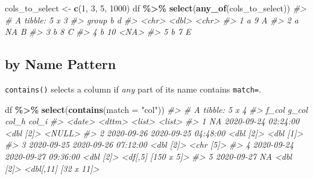 \documentclass[
]{report}
\newenvironment{Shaded}{\begin{snugshade}}{\end{snugshade}}
\newcommand{\CommentTok}[1]{\textcolor[rgb]{0.56,0.35,0.01}{\textit{#1}}}
\newcommand{\DataTypeTok}[1]{\textcolor[rgb]{0.13,0.29,0.53}{#1}}
\newcommand{\DecValTok}[1]{\textcolor[rgb]{0.00,0.00,0.81}{#1}}
\newcommand{\KeywordTok}[1]{\textcolor[rgb]{0.13,0.29,0.53}{\textbf{#1}}}
\newcommand{\NormalTok}[1]{#1}
\newcommand{\OperatorTok}[1]{\textcolor[rgb]{0.81,0.36,0.00}{\textbf{#1}}}
\newcommand{\StringTok}[1]{\textcolor[rgb]{0.31,0.60,0.02}{#1}}
\begin{document}
\begin{Shaded}
\begin{Highlighting}[]
\NormalTok{cols\_to\_select \textless{}{-}}\StringTok{ }\KeywordTok{c}\NormalTok{(}\DecValTok{1}\NormalTok{, }\DecValTok{3}\NormalTok{, }\DecValTok{5}\NormalTok{, }\DecValTok{1000}\NormalTok{)}
\NormalTok{df }\OperatorTok{\%\textgreater{}\%}
\StringTok{  }\KeywordTok{select}\NormalTok{(}\KeywordTok{any\_of}\NormalTok{(cols\_to\_select))}
\CommentTok{\#\textgreater{} \# A tibble: 5 x 3}
\CommentTok{\#\textgreater{}   group     b d    }
\CommentTok{\#\textgreater{}   \textless{}chr\textgreater{} \textless{}dbl\textgreater{} \textless{}chr\textgreater{}}
\CommentTok{\#\textgreater{} 1 a         9 A    }
\CommentTok{\#\textgreater{} 2 a        NA B    }
\CommentTok{\#\textgreater{} 3 b         8 C    }
\CommentTok{\#\textgreater{} 4 b        10 \textless{}NA\textgreater{} }
\CommentTok{\#\textgreater{} 5 b         7 E}
\end{Highlighting}
\end{Shaded}

\hypertarget{by-name-pattern}{%
\subsection{by Name Pattern}\label{by-name-pattern}}

\texttt{contains()} selects a column if \emph{any} part of its name contains \texttt{match=}.

\begin{Shaded}
\begin{Highlighting}[]
\NormalTok{df }\OperatorTok{\%\textgreater{}\%}
\StringTok{  }\KeywordTok{select}\NormalTok{(}\KeywordTok{contains}\NormalTok{(}\DataTypeTok{match =} \StringTok{"col"}\NormalTok{))}
\CommentTok{\#\textgreater{} \# A tibble: 5 x 4}
\CommentTok{\#\textgreater{}   f\_col      g\_col               col\_h     col\_i               }
\CommentTok{\#\textgreater{}   \textless{}date\textgreater{}     \textless{}dttm\textgreater{}              \textless{}list\textgreater{}    \textless{}list\textgreater{}              }
\CommentTok{\#\textgreater{} 1 NA         2020{-}09{-}24 02:24:00 \textless{}dbl [2]\textgreater{} \textless{}NULL\textgreater{}              }
\CommentTok{\#\textgreater{} 2 2020{-}09{-}26 2020{-}09{-}25 04:48:00 \textless{}dbl [2]\textgreater{} \textless{}dbl [1]\textgreater{}           }
\CommentTok{\#\textgreater{} 3 2020{-}09{-}25 2020{-}09{-}26 07:12:00 \textless{}dbl [2]\textgreater{} \textless{}chr [5]\textgreater{}           }
\CommentTok{\#\textgreater{} 4 2020{-}09{-}24 2020{-}09{-}27 09:36:00 \textless{}dbl [2]\textgreater{} \textless{}df[,5] [150 x 5]\textgreater{}  }
\CommentTok{\#\textgreater{} 5 2020{-}09{-}27 NA                  \textless{}dbl [2]\textgreater{} \textless{}dbl[,11] [32 x 11]\textgreater{}}
\end{Highlighting}
\end{Shaded}
\end{document}
